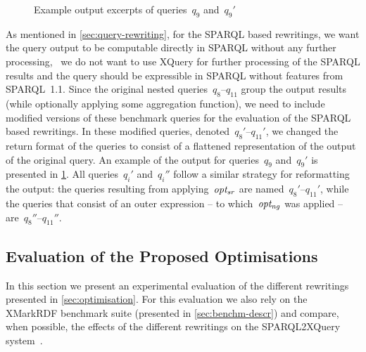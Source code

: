 \begin{figure}[t]

  \caption{Example output excerpts of queries~$q_{9}$ and~$q_{9}'$}
  \label{fig:output}
\end{figure}



As mentioned in \cref{sec:query-rewriting}, for the SPARQL based rewritings, we want the query output to be
computable directly in SPARQL without any further processing, \ie~we do not want to use XQuery for further processing
of the SPARQL results and the query should be expressible in SPARQL without features from SPARQL~1.1.  
%
Since the original nested queries~$q_8$--$q_{11}$ group the output results (while optionally applying some aggregation
function), we need to include modified versions of these benchmark queries for the evaluation of the SPARQL based
rewritings.
%
In these modified queries, denoted~$q_{8}'$--$q_{11}'$, we changed the return format of the queries to consist of a
flattened representation of the output of the original query.  An example of the output for queries~$q_{9}$ and~$q_{9}'$
is presented in \cref{fig:output}.
%
All queries~$q_i'$ and~$q_i''$ follow a similar strategy for reformatting the output:
%
the queries resulting from applying~$\mathit{opt_{sr}}$ are named~$q_8'$--$q_{11}'$, while the queries that consist of
an outer \FOR expression -- to which~$\mathit{opt_{ng}}$ was applied -- are~$q_8''$--$q_{11}''$.



\subsection{Evaluation of the Proposed Optimisations}
\label{sec:exper-eval}

In this section we present an experimental evaluation of the different rewritings presented in
\cref{sec:optimisation}.
%
For this evaluation we also rely on the XMarkRDF benchmark suite (presented in \cref{sec:benchm-descr}) and
compare, when possible, the effects of the different rewritings on the SPARQL2XQuery
system~\cite{GroppeGroppeLinnemann:2008aa}.
%



